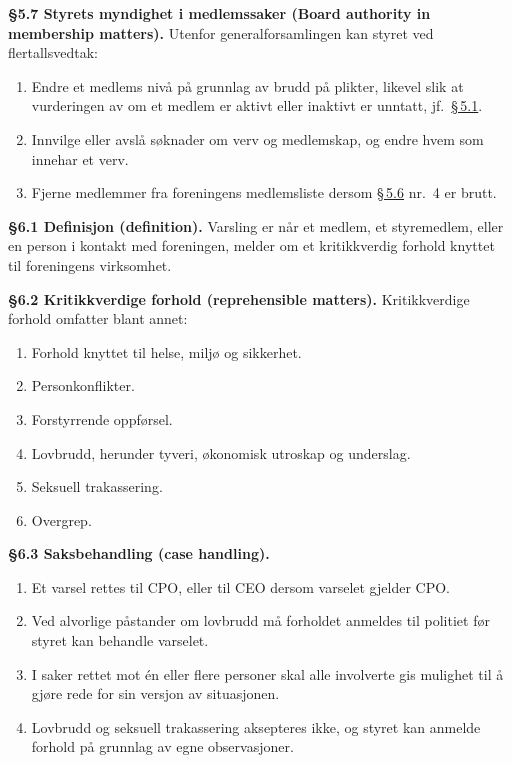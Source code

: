 \documentclass{../../../Common/Latex/Templates/rapport}
\begin{document}
\textbf{\S 5.7 Styrets myndighet i medlemssaker (Board authority in membership matters).}\label{nbylaw:5.7} Utenfor generalforsamlingen kan styret ved flertallsvedtak:
\begin{enumerate}
  \item Endre et medlems niv\r{a} p\r{a} grunnlag av brudd p\r{a} plikter, likevel slik at vurderingen av om et medlem er aktivt eller inaktivt er unntatt, jf.\ \hyperref[nbylaw:5.1]{\S\,5.1}.
  \item Innvilge eller avsl\r{a} søknader om verv og medlemskap, og endre hvem som innehar et verv.
  \item Fjerne medlemmer fra foreningens medlemsliste dersom \hyperref[nbylaw:5.6]{\S\,5.6} nr.\ 4 er brutt.
\end{enumerate}

\label{nbylaw:6}
\textbf{\S 6.1 Definisjon (definition).}\label{nbylaw:6.1} Varsling er n\r{a}r et medlem, et styremedlem, eller en person i kontakt med foreningen, melder om et kritikkverdig forhold knyttet til foreningens virksomhet.

\textbf{\S 6.2 Kritikkverdige forhold (reprehensible matters).}\label{nbylaw:6.2} Kritikkverdige forhold omfatter blant annet:
\begin{enumerate}
  \item Forhold knyttet til helse, miljø og sikkerhet.
  \item Personkonflikter.
  \item Forstyrrende oppførsel.
  \item Lovbrudd, herunder tyveri, økonomisk utroskap og underslag.
  \item Seksuell trakassering.
  \item Overgrep.
\end{enumerate}

\textbf{\S 6.3 Saksbehandling (case handling).}\label{nbylaw:6.3}
\begin{enumerate}
  \item Et varsel rettes til CPO, eller til CEO dersom varselet gjelder CPO.
  \item Ved alvorlige p\r{a}stander om lovbrudd m\r{a} forholdet anmeldes til politiet før styret kan behandle varselet.
  \item I saker rettet mot \'en eller flere personer skal alle involverte gis mulighet til \r{a} gjøre rede for sin versjon av situasjonen.
  \item Lovbrudd og seksuell trakassering aksepteres ikke, og styret kan anmelde forhold p\r{a} grunnlag av egne observasjoner.
\end{enumerate}
\end{document}
